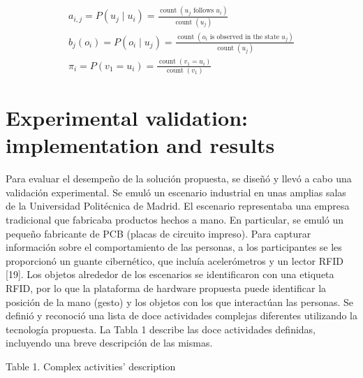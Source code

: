 \documentclass[10pt]{article}
\begin{document}
$$
\begin{gathered}
a_{i, j}=P\left(u_{j} \mid u_{i}\right)=\frac{\operatorname{count}\left(u_{j} \text { follows } u_{i}\right)}{\operatorname{count}\left(u_{j}\right)} \\
b_{j}\left(o_{i}\right)=P\left(o_{i} \mid u_{j}\right)=\frac{\operatorname{count}\left(o_{i} \text { is observed in the state } u_{j}\right)}{\operatorname{count}\left(u_{j}\right)} \\
\pi_{i}=P\left(v_{1}=u_{i}\right)=\frac{\operatorname{count}\left(v_{1}=u_{i}\right)}{\operatorname{count}\left(v_{1}\right)}
\end{gathered}
$$

\section{Experimental validation: implementation and results}
Para evaluar el desempeño de la solución propuesta, se diseñó y llevó a cabo una validación experimental. Se emuló un escenario industrial en unas amplias salas de la Universidad Politécnica de Madrid. El escenario representaba una empresa tradicional que fabricaba productos hechos a mano. En particular, se emuló un pequeño fabricante de PCB (placas de circuito impreso). Para capturar información sobre el comportamiento de las personas, a los participantes se les proporcionó un guante cibernético, que incluía acelerómetros y un lector RFID [19]. Los objetos alrededor de los escenarios se identificaron con una etiqueta RFID, por lo que la plataforma de hardware propuesta puede identificar la posición de la mano (gesto) y los objetos con los que interactúan las personas. Se definió y reconoció una lista de doce actividades complejas diferentes utilizando la tecnología propuesta. La Tabla 1 describe las doce actividades definidas, incluyendo una breve descripción de las mismas. 

Table 1. Complex activities' description
\end{document}
